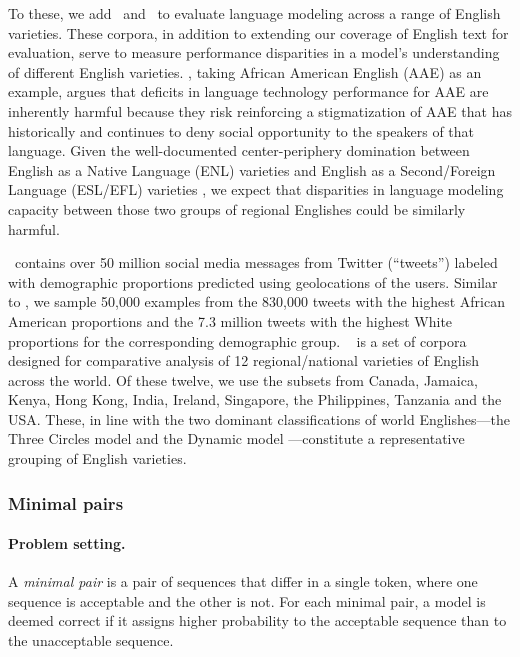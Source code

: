 To these, we add \twitteraae~and \ice~to evaluate language modeling across a range of English varieties. 
These corpora, in addition to extending our coverage of English text for evaluation, serve to measure performance disparities in a model's understanding of different English varieties. 
\citet{blodgett2020critical}, taking African American English (AAE) as an example, argues that deficits in language technology performance for AAE are inherently harmful because they risk reinforcing a stigmatization of AAE that has historically and continues to deny social opportunity to the speakers of that language. 
Given the well-documented center-periphery domination between English as a Native Language (ENL) varieties and English as a Second/Foreign Language (ESL/EFL) varieties \citep{kachru2009handbook}, we expect that disparities in language modeling capacity between those two groups of regional Englishes could be similarly harmful.

\twitteraae~contains over 50 million social media messages from Twitter (``tweets'') labeled with demographic proportions predicted using geolocations of the users. Similar to \citet{blodgett2016}, we sample 50,000 examples from the 830,000 tweets with the highest African American proportions and the 7.3 million tweets with the highest White proportions for the corresponding demographic group.
\ice~ is a set of corpora designed for comparative analysis of 12 regional/national varieties of English across the world. 
Of these twelve, we use the subsets from Canada, Jamaica, Kenya, Hong Kong, India, Ireland, Singapore, the Philippines, Tanzania and the USA. 
These, in line with the two dominant classifications of world Englishes—the Three Circles model and the Dynamic model \citep{kirkpatrick2020routledge}—constitute a representative grouping of English varieties.

\subsubsection{Minimal pairs}
\label{sec:language-minimal-pairs}

\paragraph{Problem setting.}
A \textit{minimal pair} is a pair of sequences that differ in a single token, where one sequence is acceptable and the other is not.
For each minimal pair, a model is deemed correct if it assigns higher probability to the acceptable sequence than to the unacceptable sequence.

